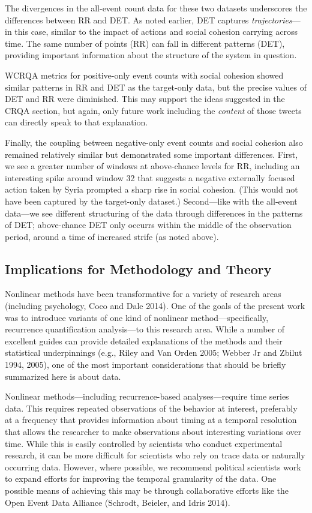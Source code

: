\documentclass[
  english,
  man]{apa6}
\begin{document}
The divergences in the all-event count data for these two datasets underscores
the differences between RR and DET. As noted earlier, DET captures
\emph{trajectories}---in this case, similar to the impact of actions and social
cohesion carrying across time. The same number of points (RR) can fall in
different patterns (DET), providing important information about the structure of
the system in question.

WCRQA metrics for positive-only event counts with social cohesion showed similar
patterns in RR and DET as the target-only data, but the precise values of DET
and RR were diminished. This may support the ideas suggested in the CRQA
section, but again, only future work including the \emph{content} of those tweets can
directly speak to that explanation.

Finally, the coupling between negative-only event counts and social cohesion
also remained relatively similar but demonstrated some important differences.
First, we see a greater number of windows at above-chance levels for RR,
including an interesting spike around window 32 that suggests a negative
externally focused action taken by Syria prompted a sharp rise in social
cohesion. (This would not have been captured by the target-only dataset.)
Second---like with the all-event data---we see different structuring of the data
through differences in the patterns of DET; above-chance DET only occurrs within
the middle of the observation period, around a time of increased strife (as
noted above).

\hypertarget{implications-for-methodology-and-theory}{%
\subsection{Implications for Methodology and Theory}\label{implications-for-methodology-and-theory}}

Nonlinear methods have been transformative for a variety of research areas
(including psychology, Coco and Dale 2014). One of the goals of the present work was
to introduce variants of one kind of nonlinear method---specifically, recurrence
quantification analysis---to this research area. While a number of excellent
guides can provide detailed explanations of the methods and their statistical
underpinnings (e.g., Riley and Van Orden 2005; Webber Jr and Zbilut 1994, 2005), one of the most important considerations that should be
briefly summarized here is about data.

Nonlinear methods---including recurrence-based analyses---require time series
data. This requires repeated observations of the behavior at interest,
preferably at a frequency that provides information about timing at a temporal
resolution that allows the researcher to make observations about interesting
variations over time. While this is easily controlled by scientists who conduct
experimental research, it can be more difficult for scientists who rely on trace
data or naturally occurring data. However, where possible, we recommend
political scientists work to expand efforts for improving the temporal
granularity of the data. One possible means of achieving this may be through
collaborative efforts like the Open Event Data Alliance (Schrodt, Beieler, and Idris 2014).
\end{document}
